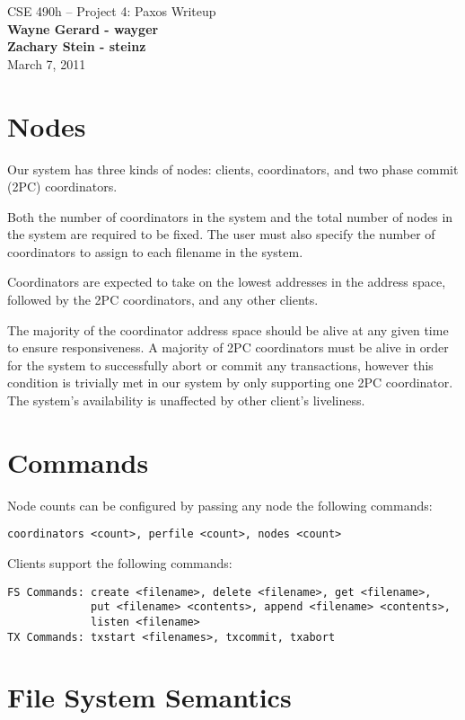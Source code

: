 \documentclass[11pt]{article}
\begin{document}
\begin{center}
{\large CSE 490h -- Project 4: Paxos Writeup} \\
\textbf{Wayne Gerard - wayger} \\
\textbf{Zachary Stein - steinz} \\
March 7, 2011
\end{center}

\section{Nodes}

Our system has three kinds of nodes: clients, coordinators, and two phase commit (2PC) coordinators.

Both the number of coordinators in the system and the total number of nodes in the system are required to be fixed.
The user must also specify the number of coordinators to assign to each filename in the system.

Coordinators are expected to take on the lowest addresses in the address space, followed by the 2PC coordinators, and any other clients.

The majority of the coordinator address space should be alive at any given time to ensure responsiveness. 
A majority of 2PC coordinators must be alive in order for the system to successfully abort or commit any transactions, however this condition is trivially met in our system by only supporting one 2PC coordinator.
The system's availability is unaffected by other client's liveliness.

\section{Commands} 

Node counts can be configured by passing any node the following commands:
\begin{verbatim}
coordinators <count>, perfile <count>, nodes <count>
\end{verbatim}

Clients support the following commands:
\begin{verbatim}
FS Commands: create <filename>, delete <filename>, get <filename>, 
             put <filename> <contents>, append <filename> <contents>,
             listen <filename>
TX Commands: txstart <filenames>, txcommit, txabort
\end{verbatim}

\section{File System Semantics} 
\end{document}
